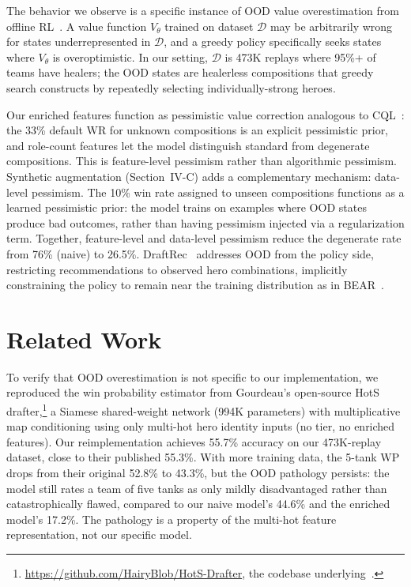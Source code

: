 \documentclass[conference]{IEEEtran}
\begin{document}
The behavior we observe is a specific instance of OOD value overestimation from offline RL~\cite{kumar2020conservative,levine2020offline}. A value function $V_\theta$ trained on dataset $\mathcal{D}$ may be arbitrarily wrong for states underrepresented in $\mathcal{D}$, and a greedy policy specifically seeks states where $V_\theta$ is overoptimistic. In our setting, $\mathcal{D}$ is 473K replays where 95\%+ of teams have healers; the OOD states are healerless compositions that greedy search constructs by repeatedly selecting individually-strong heroes.

Our enriched features function as pessimistic value correction analogous to CQL~\cite{kumar2020conservative}: the 33\% default WR for unknown compositions is an explicit pessimistic prior, and role-count features let the model distinguish standard from degenerate compositions. This is feature-level pessimism rather than algorithmic pessimism. Synthetic augmentation (Section~IV-C) adds a complementary mechanism: data-level pessimism. The 10\% win rate assigned to unseen compositions functions as a learned pessimistic prior: the model trains on examples where OOD states produce bad outcomes, rather than having pessimism injected via a regularization term. Together, feature-level and data-level pessimism reduce the degenerate rate from 76\% (naive) to 26.5\%. DraftRec~\cite{lee2022draftrec} addresses OOD from the policy side, restricting recommendations to observed hero combinations, implicitly constraining the policy to remain near the training distribution as in BEAR~\cite{kumar2019stabilizing}.

\section{Related Work}

To verify that OOD overestimation is not specific to our implementation, we reproduced the win probability estimator from Gourdeau's open-source HotS drafter,\footnote{\url{https://github.com/HairyBlob/HotS-Drafter}, the codebase underlying~\cite{gourdeau2021discriminative}.} a Siamese shared-weight network (994K parameters) with multiplicative map conditioning using only multi-hot hero identity inputs (no tier, no enriched features). Our reimplementation achieves 55.7\% accuracy on our 473K-replay dataset, close to their published 55.3\%. With more training data, the 5-tank WP drops from their original 52.8\% to 43.3\%, but the OOD pathology persists: the model still rates a team of five tanks as only mildly disadvantaged rather than catastrophically flawed, compared to our naive model's 44.6\% and the enriched model's 17.2\%. The pathology is a property of the multi-hot feature representation, not our specific model.
\end{document}
